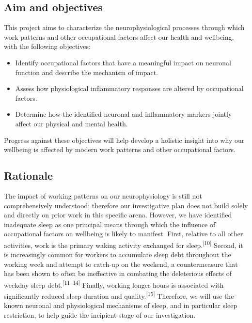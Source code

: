 \documentclass[
  english,
  man, donotrepeattitle,floatsintext]{apa6}
\providecommand{\tightlist}{%
  \setlength{\itemsep}{0pt}\setlength{\parskip}{0pt}}
\begin{document}
\hypertarget{aim-and-objectives}{%
\subsection{Aim and objectives}\label{aim-and-objectives}}

This project aims to characterize the neurophysiological processes through which work patterns and other occupational factors affect our health and wellbeing, with the following objectives:

\begin{itemize}
\tightlist
\item
  Identify occupational factors that have a meaningful impact on neuronal function and describe the mechanism of impact.
\item
  Assess how physiological inflammatory responses are altered by occupational factors.
\item
  Determine how the identified neuronal and inflammatory markers jointly affect our physical and mental health.
\end{itemize}

Progress against these objectives will help develop a holistic insight into why our wellbeing is affected by modern work patterns and other occupational factors.

\newpage

\hypertarget{rationale}{%
\subsection{Rationale}\label{rationale}}

The impact of working patterns on our neurophysiology is still not comprehensively understood; therefore our investigative plan does not build solely and directly on prior work in this specific arena. However, we have identified inadequate sleep as one principal means through which the influence of occupational factors on wellbeing is likely to manifest. First, relative to all other activities, work is the primary waking activity exchanged for sleep.\textsuperscript{{[}10{]}} Second, it is increasingly common for workers to accumulate sleep debt throughout the working week and attempt to catch-up on the weekend, a countermeasure that has been shown to often be ineffective in combating the deleterious effects of weekday sleep debt.\textsuperscript{{[}11--14{]}} Finally, working longer hours is associated with significantly reduced sleep duration and quality.\textsuperscript{{[}15{]}} Therefore, we will use the known neuronal and physiological mechanisms of sleep, and in particular sleep restriction, to help guide the incipient stage of our investigation.
\end{document}
